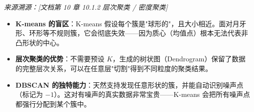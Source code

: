 \documentclass[a4paper,11pt]{ctexart}
\begin{document}
\begin{problembox}
    \vspace{0.2cm}
    {\color{gray}\small\textit{来源溯源：[文档第 10 章 10.1.2 层次聚类 / 密度聚类]}}
\end{problembox}

\begin{beginnerbox}
    \begin{itemize}
        \item \textbf{K-means 的盲区}：K-means 假设每个簇是"球形的"，且大小相近。面对月牙形、环形等不规则簇，它会彻底失效——因为质心（均值点）根本无法代表非凸形状的中心。
        \item \textbf{层次聚类的优势}：不需要预设 $K$，生成的树状图（Dendrogram）保留了数据的完整层次关系，可以在任意层"切割"得到不同粒度的聚类结果。
        \item \textbf{DBSCAN 的独特能力}：天然支持发现任意形状的簇，并能自动识别噪声点（标记为 $-1$）。这对有噪声的真实数据非常宝贵——K-means 会把所有噪声点都强行分配到某个簇中。
    \end{itemize}
\end{beginnerbox}
\end{document}
